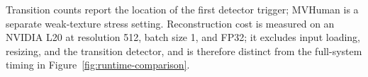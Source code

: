 \begin{table}[t]
  \vspace{3pt}
  \parbox{0.97\textwidth}{\footnotesize Transition counts report the location
  of the first detector trigger; MVHuman is a separate weak-texture stress
  setting. Reconstruction cost is measured on an NVIDIA
  L20 at resolution 512, batch size 1, and FP32; it excludes input loading,
  resizing, and the transition detector, and is therefore distinct from the
  full-system timing in Figure~\ref{fig:runtime-comparison}.}
\end{table}
